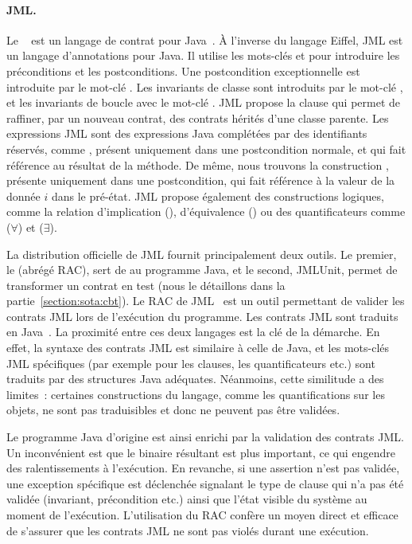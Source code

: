 \paragraph{JML.} Le ~ est un
langage de contrat pour Java~. À l'inverse du langage Eiffel, JML
est un langage d'annotations pour Java. Il utilise les mots-clés 
et  pour introduire les préconditions et les postconditions. Une
postcondition exceptionnelle est introduite par le mot-clé . Les
invariants de classe sont introduits par le mot-clé , et les
invariants de boucle avec le mot-clé . JML propose la
clause  qui permet de raffiner, par un nouveau contrat, des contrats
hérités d'une classe parente. Les expressions JML sont des expressions Java
complétées par des identifiants réservés, comme \aresult, présent uniquement
dans une postcondition normale, et qui fait référence au résultat de la méthode.
De même, nous trouvons la construction , présente uniquement dans une
postcondition, qui fait référence à la valeur de la donnée $i$ dans le pré-état.
JML propose également des constructions logiques, comme la relation
d'implication (\code{==>}), d'équivalence (\code{<==>}) ou des quantificateurs
comme  ($\forall$) et  ($\exists$).

La distribution officielle de JML fournit principalement deux outils.  Le
premier, le  (abrégé RAC), sert de
 au programme Java, et le second, JMLUnit, permet de
transformer un contrat en test (nous le détaillons dans la
partie~\ref{section:sota:cbt}). Le RAC de JML~ est un outil
permettant de valider les contrats JML lors de l'exécution du programme. Les
contrats JML sont traduits en Java~. La proximité entre ces
deux langages est la clé de la démarche. En effet, la syntaxe des contrats JML
est similaire à celle de Java, et les mots-clés JML spécifiques (par exemple
pour les clauses, les quantificateurs etc.) sont traduits par des structures
Java adéquates.  Néanmoins, cette similitude a des limites~: certaines
constructions du langage, comme les quantifications sur les objets, ne sont pas
traduisibles et donc ne peuvent pas être validées.

Le programme Java d'origine est ainsi enrichi par la validation des contrats
JML. Un inconvénient est que le binaire résultant est plus important, ce qui
engendre des ralentissements à l'exécution. En revanche, si une assertion n'est
pas validée, une exception spécifique est déclenchée signalant le type de clause
qui n'a pas été validée (invariant, précondition etc.) ainsi que l'état visible
du système au moment de l'exécution. L'utilisation du RAC confère un moyen
direct et efficace de s'assurer que les contrats JML ne sont pas violés durant
une exécution.

